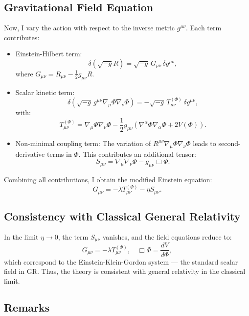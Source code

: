 \documentclass[12pt]{article}
\begin{document}
\subsection{Gravitational Field Equation}

Now, I vary the action with respect to the inverse metric \( g^{\mu\nu} \). Each term contributes:

\begin{itemize}
    \item Einstein-Hilbert term:
    \[
    \delta \left( \sqrt{-g} R \right) = \sqrt{-g} \, G_{\mu\nu} \, \delta g^{\mu\nu},
    \]
    where \( G_{\mu\nu} = R_{\mu\nu} - \frac{1}{2} g_{\mu\nu} R \).

    \item Scalar kinetic term:
    \[
    \delta \left( \sqrt{-g} \, g^{\mu\nu} \nabla_\mu \Phi \nabla_\nu \Phi \right) = -\sqrt{-g} \, T^{(\Phi)}_{\mu\nu} \, \delta g^{\mu\nu},
    \]
    with:
    \[
    T^{(\Phi)}_{\mu\nu} = \nabla_\mu \Phi \nabla_\nu \Phi - \frac{1}{2} g_{\mu\nu} \left( \nabla^\alpha \Phi \nabla_\alpha \Phi + 2V(\Phi) \right).
    \]

    \item Non-minimal coupling term:
    The variation of \( R^{\mu\nu} \nabla_\mu \Phi \nabla_\nu \Phi \) leads to second-derivative terms in \( \Phi \). This contributes an additional tensor:
    \[
    S_{\mu\nu} = \nabla_\mu \nabla_\nu \Phi - g_{\mu\nu} \Box \Phi.
    \]
\end{itemize}

Combining all contributions, I obtain the modified Einstein equation:
\begin{equation}
G_{\mu\nu} = -\lambda T^{(\Phi)}_{\mu\nu} - \eta S_{\mu\nu}.
\label{eq:modified_field_eq}
\end{equation}

\subsection{Consistency with Classical General Relativity}

In the limit \( \eta \to 0 \), the term \( S_{\mu\nu} \) vanishes, and the field equations reduce to:
\[
G_{\mu\nu} = -\lambda T^{(\Phi)}_{\mu\nu}, \quad \Box \Phi = \frac{dV}{d\Phi},
\]
which correspond to the Einstein-Klein-Gordon system — the standard scalar field in GR. Thus, the theory is consistent with general relativity in the classical limit.

\subsection{Remarks}
\end{document}
